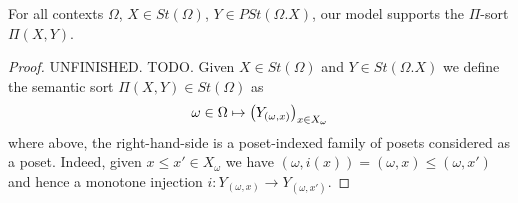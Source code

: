 \documentclass[sigplan,10pt,review,anonymous]{acmart}
\newcommand{\fm}[2]{
\left(
\tiny
#1
\normalsize
\right)_{#2}
}
\begin{document}
\begin{theorem}
For all contexts $\Omega$, $X \in \mathit{St}(\Omega)$, $Y \in \mathit{PSt}(\Omega . X)$, our model supports the $\Pi$-sort $\Pi(X,Y)$.
\end{theorem}

\begin{proof}

UNFINISHED. TODO.
Given $X \in \mathit{St}(\Omega)$ and $Y \in \mathit{St}(\Omega . X)$ we define the semantic sort $\Pi(X,Y) \in \mathit{St}(\Omega)$ as 
$$\omega \in \Omega \mapsto \fm{Y_{(\omega,x)}}{x \in X_\omega}$$
where above, the right-hand-side is a poset-indexed family of posets considered as a poset. Indeed, given $x \leq x' \in X_\omega$ we have $(\omega, i(x)) = (\omega,x) \leq (\omega,x')$ and hence a monotone injection $i : Y_{(\omega,x)} \to Y_{(\omega,x')}$. 

\end{proof}
\end{document}
